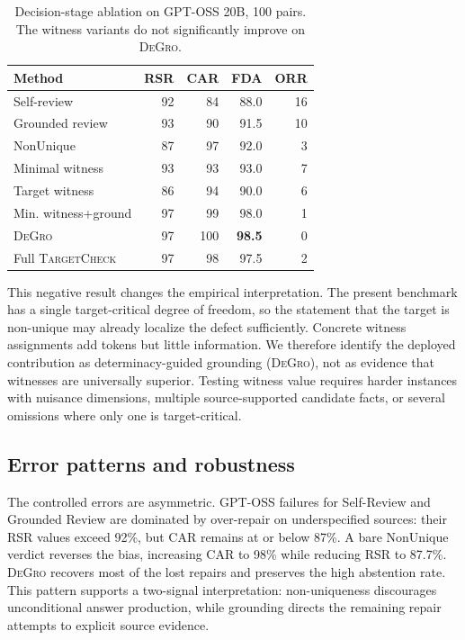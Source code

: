 \documentclass[sigconf,anonymous]{aamas}
\newcommand{\method}{\textsc{DeGro}}
\newcommand{\tc}{\textsc{TargetCheck}}
\begin{document}
\begin{table}[t]
\centering
\caption{Decision-stage ablation on GPT-OSS 20B, 100 pairs.  The witness variants do not significantly improve on \method.}
\label{tab:ablation}
\small
\begin{tabular}{lrrrr}
\toprule
Method & RSR & CAR & FDA & ORR\\
\midrule
Self-review & 92 & 84 & 88.0 & 16\\
Grounded review & 93 & 90 & 91.5 & 10\\
NonUnique & 87 & 97 & 92.0 & 3\\
Minimal witness & 93 & 93 & 93.0 & 7\\
Target witness & 86 & 94 & 90.0 & 6\\
Min. witness+ground & 97 & 99 & 98.0 & 1\\
\method & 97 & 100 & \textbf{98.5} & 0\\
Full \tc & 97 & 98 & 97.5 & 2\\
\bottomrule
\end{tabular}
\end{table}

This negative result changes the empirical interpretation.  The present benchmark has a single target-critical degree of freedom, so the statement that the target is non-unique may already localize the defect sufficiently.  Concrete witness assignments add tokens but little information.  We therefore identify the deployed contribution as determinacy-guided grounding (\method), not as evidence that witnesses are universally superior.  Testing witness value requires harder instances with nuisance dimensions, multiple source-supported candidate facts, or several omissions where only one is target-critical.

\subsection{Error patterns and robustness}
The controlled errors are asymmetric.  GPT-OSS failures for Self-Review and Grounded Review are dominated by over-repair on underspecified sources: their RSR values exceed 92\%, but CAR remains at or below 87\%.  A bare NonUnique verdict reverses the bias, increasing CAR to 98\% while reducing RSR to 87.7\%.  \method{} recovers most of the lost repairs and preserves the high abstention rate.  This pattern supports a two-signal interpretation: non-uniqueness discourages unconditional answer production, while grounding directs the remaining repair attempts to explicit source evidence.
\end{document}
